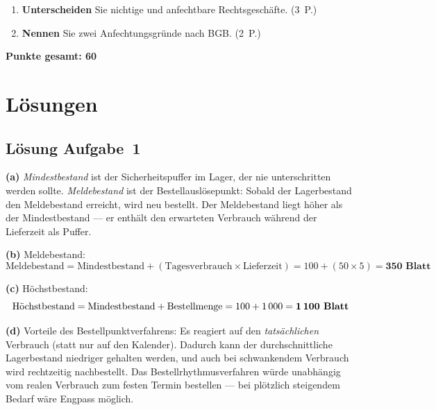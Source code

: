 \documentclass[11pt, a4paper]{article}
\begin{document}
\medskip
\begin{enumerate}[label=(\alph*)]
  \item \textbf{Unterscheiden} Sie nichtige und anfechtbare Rechtsgeschäfte. \hfill (3~P.)
  \item \textbf{Nennen} Sie zwei Anfechtungsgründe nach BGB. \hfill (2~P.)
\end{enumerate}

\vspace{1em}
\noindent\textbf{Punkte gesamt: 60}

\newpage

\section{Lösungen}\label{loesungen}

\subsection*{Lösung Aufgabe~1}
\begin{loesung}
\textbf{(a)} \emph{Mindestbestand} ist der Sicherheitspuffer im Lager, der nie unterschritten
werden sollte. \emph{Meldebestand} ist der Bestellauslöse\-punkt: Sobald der Lagerbestand
den Meldebestand erreicht, wird neu bestellt. Der Meldebestand liegt höher als der
Mindestbestand --- er enthält den erwarteten Verbrauch während der Lieferzeit als Puffer.

\textbf{(b)} Meldebestand:
$$\text{Meldebestand} = \text{Mindestbestand} + (\text{Tagesverbrauch} \times \text{Lieferzeit}) = 100 + (50 \times 5) = \textbf{350 Blatt}$$

\textbf{(c)} Höchstbestand:
$$\text{Höchstbestand} = \text{Mindestbestand} + \text{Bestellmenge} = 100 + 1\,000 = \textbf{1\,100 Blatt}$$

\textbf{(d)} Vorteile des Bestellpunktverfahrens: Es reagiert auf den \emph{tatsächlichen}
Verbrauch (statt nur auf den Kalender). Dadurch kann der durchschnittliche Lagerbestand
niedriger gehalten werden, und auch bei schwankendem Verbrauch wird rechtzeitig nachbestellt.
Das Bestellrhythmus\-verfahren würde unabhängig vom realen Verbrauch zum festen Termin
bestellen --- bei plötzlich steigendem Bedarf wäre Engpass möglich.
\end{loesung}
\end{document}
